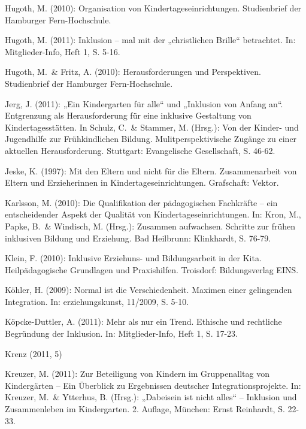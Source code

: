 
Hugoth, M. (2010): Organisation von Kindertageseinrichtungen. Studienbrief der Hamburger Fern-Hochschule.

Hugoth, M. (2011): Inklusion – mal mit der „christlichen Brille“ betrachtet. In: Mitglieder-Info, Heft 1, S. 5-16.

Hugoth, M.~\& Fritz, A. (2010): Herausforderungen und Perspektiven. Studienbrief der Hamburger Fern-Hochschule.

Jerg, J. (2011): „Ein Kindergarten für alle“ und „Inklusion von Anfang an“. Entgrenzung als Herausforderung für eine inklusive Gestaltung von Kindertagesstätten. In Schulz, C.~\& Stammer, M. (Hrsg.): Von der Kinder- und Jugendhilfe zur Frühkindlichen Bildung. Mulitperspektivische Zugänge zu einer aktuellen Herausforderung. Stuttgart: Evangelische Gesellschaft, S. 46-62. 

Jeske, K. (1997): Mit den Eltern und nicht für die Eltern. Zusammenarbeit von Eltern und Erzieherinnen in Kindertageseinrichtungen. Grafschaft: Vektor.

Karlsson, M. (2010): Die Qualifikation der pädagogischen Fachkräfte -- ein entscheidender Aspekt der Qualität von Kindertageseinrichtungen. In: Kron, M., Papke, B.~\& Windisch, M. (Hrsg.): Zusammen aufwachsen. Schritte zur frühen inklusiven Bildung und Erziehung. Bad Heilbrunn: Klinkhardt, S. 76-79. 

Klein, F. (2010): Inklusive Erziehuns- und Bildungsarbeit in der Kita. Heilpädagogische Grundlagen und Praxishilfen. Troisdorf: Bildungsverlag EINS.


Köhler, H. (2009): Normal ist die Verschiedenheit. Maximen einer gelingenden Integration. In: erziehungskunst, 11/2009, S. 5-10.

Köpcke-Duttler, A. (2011): Mehr als nur ein Trend. Ethische und rechtliche Begründung der Inklusion. In: Mitglieder-Info, Heft 1, S. 17-23.

Krenz (2011, 5)

Kreuzer, M. (2011): Zur Beteiligung von Kindern im Gruppenalltag von Kindergärten – Ein Überblick zu Ergebnissen deutscher Integrationsprojekte. In: Kreuzer, M.~\& Ytterhus, B. (Hrsg.): „Dabeisein ist nicht alles“ – Inklusion und Zusammenleben im Kindergarten. 2. Auflage, München: Ernst Reinhardt, S. 22-33.

